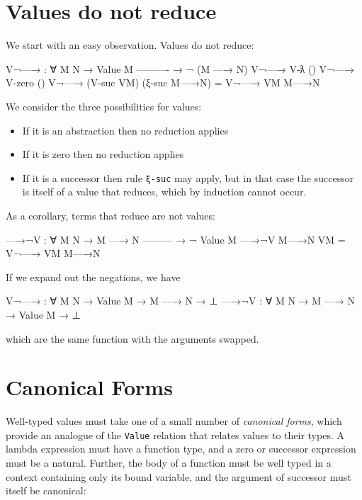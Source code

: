 \hypertarget{values-do-not-reduce}{%
\section{Values do not reduce}\label{values-do-not-reduce}}

We start with an easy observation. Values do not reduce:

\begin{fence}
\begin{code}
V¬—→ : ∀ {M N}
  → Value M
    ----------
  → ¬ (M —→ N)
V¬—→ V-ƛ        ()
V¬—→ V-zero     ()
V¬—→ (V-suc VM) (ξ-suc M—→N) = V¬—→ VM M—→N
\end{code}
\end{fence}

We consider the three possibilities for values:

\begin{itemize}
\item
  If it is an abstraction then no reduction applies
\item
  If it is zero then no reduction applies
\item
  If it is a successor then rule \texttt{ξ-suc} may apply, but in that
  case the successor is itself of a value that reduces, which by
  induction cannot occur.
\end{itemize}

As a corollary, terms that reduce are not values:

\begin{fence}
\begin{code}
—→¬V : ∀ {M N}
  → M —→ N
    ---------
  → ¬ Value M
—→¬V M—→N VM  =  V¬—→ VM M—→N
\end{code}
\end{fence}

If we expand out the negations, we have

\begin{myDisplay}
V¬—→ : ∀ {M N} → Value M → M —→ N → ⊥
—→¬V : ∀ {M N} → M —→ N → Value M → ⊥
\end{myDisplay}

which are the same function with the arguments swapped.

\hypertarget{canonical-forms}{%
\section{Canonical Forms}\label{canonical-forms}}

Well-typed values must take one of a small number of \emph{canonical
forms}, which provide an analogue of the \texttt{Value} relation that
relates values to their types. A lambda expression must have a function
type, and a zero or successor expression must be a natural. Further, the
body of a function must be well typed in a context containing only its
bound variable, and the argument of successor must itself be canonical:

